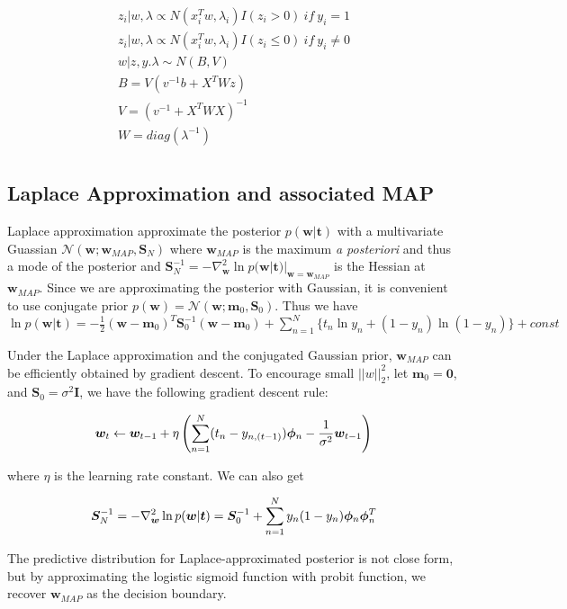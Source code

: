 \begin{eqnarray}
z_i|w,\lambda \propto N(x_i^Tw,\lambda_i)I(z_i>0)~if~y_i=1 \\
z_i|w,\lambda \propto N(x_i^Tw,\lambda_i)I(z_i\leq 0)~if~y_i\neq 0 \\
w|z,y.\lambda \sim N(B,V) \\
B = V(v^{-1}b+X^TWz) \\
V=(v^{-1}+X^TWX)^{-1} \\
W=diag(\lambda^{-1}) \\
\end{eqnarray}

\subsection{Laplace Approximation and associated MAP}

Laplace approximation approximate the posterior $p(\bm{w}|\bm{t})$ with a
multivariate Guassian $\mathcal{N}(\bm{w}; \bm{w}_{MAP}, \bm{S}_N)$ where
$\bm{w}_{MAP}$ is the maximum {\it a posteriori} and thus a mode of the
posterior and $\bm{S}_N^{-1} = -\nabla^2_{\bm{w}} \ln
p(\bm{w}|\bm{t})|_{\bm{w} = \bm{w}_{MAP}}$ is the Hessian at $\bm{w}_{MAP}$.
Since we are approximating the posterior with Gaussian, it is convenient to
use conjugate prior $p(\bm{w}) = \mathcal{N}(\bm{w};\bm{m}_0,\bm{S}_0)$. Thus
we have $\ln p(\bm{w}|\bm{t}) = -\frac{1}{2}(\bm{w}-\bm{m}_0)^T
\bm{S}_0^{-1}(\bm{w}-\bm{m}_0) + \sum_{n=1}^N\{t_n \ln y_n +(1-y_n) \ln
(1-y_n)\} + const$

Under the Laplace approximation and the conjugated Gaussian prior, $\bm{w}_{MAP}$
can be efficiently obtained by gradient descent. To encourage small
$||w||^2_2$, let $\bm{m}_0 = \bm{0}$, and $\bm{S}_0 = \sigma^2 \bm{I}$, we
have the following gradient descent rule: 

\begin{equation}
\bm{w}_t \leftarrow \bm{w}_{t-1} + \eta\left( \sum_{n=1}^N (t_n - y_{n,(t-1)}) \bm{\phi}_n -
\frac{1}{\sigma^2}\bm{w}_{t-1} \right)
\end{equation}

where $\eta$ is the learning rate constant. We can also get

\begin{equation}
\bm{S}_N^{-1} = -\nabla^2_{\bm{w}} \ln p(\bm{w}|\bm{t})
= \bm{S}_0^{-1} + \sum_{n=1}^N y_n(1-y_n) \bm{\phi}_n \bm{\phi}_n^T
\end{equation}

The predictive distribution for Laplace-approximated posterior is not close
form, but by approximating the logistic sigmoid function with probit function,
we recover $\bm{w}_{MAP}$ as the decision boundary.

